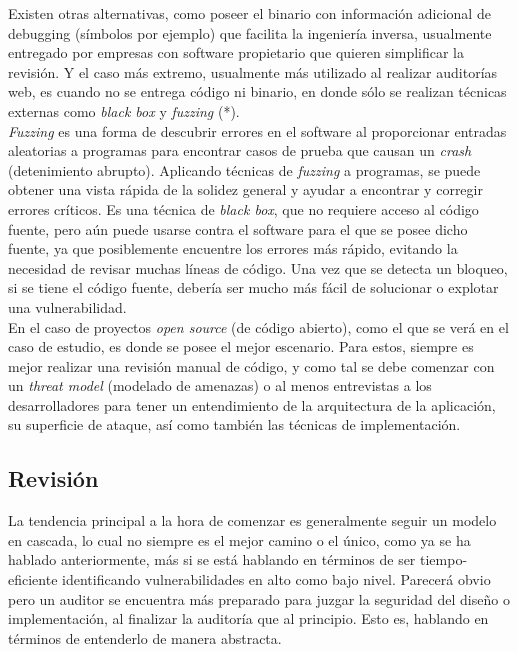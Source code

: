 Existen otras alternativas, como poseer el binario con información adicional de debugging (símbolos por ejemplo) que facilita la ingeniería inversa, usualmente entregado por empresas con software propietario que quieren simplificar la revisión. Y el caso más extremo, usualmente más utilizado al realizar auditorías web, es cuando no se entrega código ni binario, en donde sólo se realizan técnicas externas como \textit{black box} y \textit{fuzzing} (*).\\

\textit{Fuzzing} es una forma de descubrir errores en el software al proporcionar entradas aleatorias a programas para encontrar casos de prueba que causan un \textit{crash} (detenimiento abrupto). Aplicando técnicas de \textit{fuzzing} a programas, se puede obtener una vista rápida de la solidez general y ayudar a encontrar y corregir errores críticos. Es una técnica de \textit{black box}, que no requiere acceso al código fuente, pero aún puede usarse contra el software para el que se posee dicho fuente, ya que posiblemente encuentre los errores más rápido, evitando la necesidad de revisar muchas líneas de código. Una vez que se detecta un bloqueo, si se tiene el código fuente, debería ser mucho más fácil de solucionar o explotar una vulnerabilidad.\\

En el caso de proyectos \textit{open source} (de código abierto), como el que se verá en el caso de estudio, es donde se posee el mejor escenario. Para estos, siempre es mejor realizar una revisión manual de código, y como tal se debe comenzar con un \textit{threat model} (modelado de amenazas) o al menos entrevistas a los desarrolladores para tener un entendimiento de la arquitectura de la aplicación, su superficie de ataque, así como también las técnicas de implementación.

\subsection{Revisión}
La tendencia principal a la hora de comenzar es generalmente seguir un modelo en cascada, lo cual no siempre es el mejor camino o el único, como ya se ha hablado anteriormente, más si se está hablando en términos de ser tiempo-eficiente identificando vulnerabilidades en alto como bajo nivel.
Parecerá obvio pero un auditor se encuentra más preparado para juzgar la seguridad del diseño o implementación, al finalizar la auditoría que al principio. Esto es, hablando en términos de entenderlo de manera abstracta.\\

